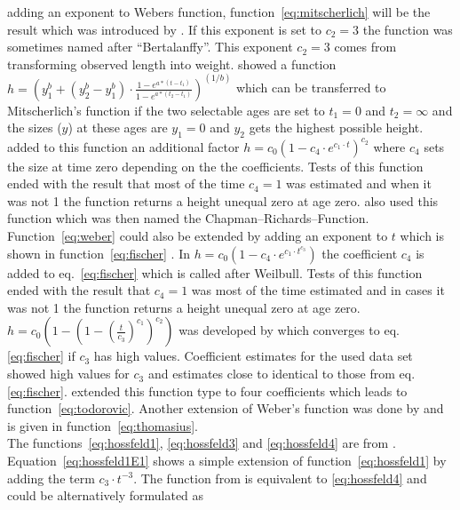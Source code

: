 \documentclass[a4paper,twocolumn]{article}
\begin{document}
adding an exponent to Webers function, function~\ref{eq:mitscherlich}
will be the result which was introduced by
\cite{mitscherlich1919Pflanzenwachstum}. If this exponent is set to
$c_2 = 3$ the function was sometimes named after ``Bertalanffy''. This
exponent $c_2 = 3$ comes from transforming observed length into
weight. \cite{schnute1981AVersatileGrowthModel} showed a function
$h= (y_1^b + (y_2^b-y_1^b) \cdot \frac{1 - e^{a*(t-t_1)}} {1 - e^{a*(t_2-t_1)}})^{(1/b)}$
which can be transferred to Mitscherlich's
function if the two selectable ages are set to $t_1=0$ and
$t_2=\infty$ and the sizes ($y$) at these ages are $y_1=0$ and $y_2$ gets the
highest possible height. \cite{richards1959GrowthCurve} added to this
function an additional factor
$h = c_0 (1 - {c_4} \cdot e^{c_1 \cdot t} )^{c_2}$ where $c_4$
sets the size at time zero depending on the the coefficients. Tests of this
function ended with the result that most of the time $c_4 = 1$ was
estimated and when it was not 1 the function returns a height
unequal zero at age zero. \cite{chapman1931Function} also used this
function which was then named the Chapman--Richards--Function.
Function~\ref{eq:weber} could also be extended by adding an exponent
to $t$ which is shown in function~\ref{eq:fischer}
\citep{fisher1928Funktion}. In
$h = c_0 (1 - {c_4} \cdot e^{c_1 \cdot t^{c_3}})$ the coefficient $c_4$
is added to eq.~\ref{eq:fischer}
which is called after Weilbull. Tests of this function ended with the
result that $c_4 = 1$ was most of the time estimated and in cases it
was not 1 the function returns a height unequal zero at age zero.
%
$h = c_0 (1 - (1 - (\frac{t}{c_3})^{c_1})^{c_2})$ was developed by
\cite{kumaraswamy1980DensityFunction} which converges to
eq.\,\ref{eq:fischer} if $c_3$ has high values. Coefficient estimates
for the used data set showed high values for $c_3$ and estimates close
to identical to those from eq.\,\ref{eq:fischer}.
\cite{todorovic1961GesetzmaessigkeitenDesWachstums} extended this
function type to four coefficients which leads to
function~\ref{eq:todorovic}. Another extension of Weber's function was
done by \cite{thomasius1964duengung} and is given in
function~\ref{eq:thomasius}.\\
%
The functions~\ref{eq:hossfeld1}, \ref{eq:hossfeld3} and
\ref{eq:hossfeld4} are from
\cite{hossfeld1822Mathematik}. Equation~\ref{eq:hossfeld1E1} shows a
simple extension of function~\ref{eq:hossfeld1} by adding the term
$c_3 \cdot t^{-3}$. The function from
\cite{morgan1975ModelForNutritionalResponse} is equivalent to
\ref{eq:hossfeld4} and could be alternatively formulated as
\end{document}
